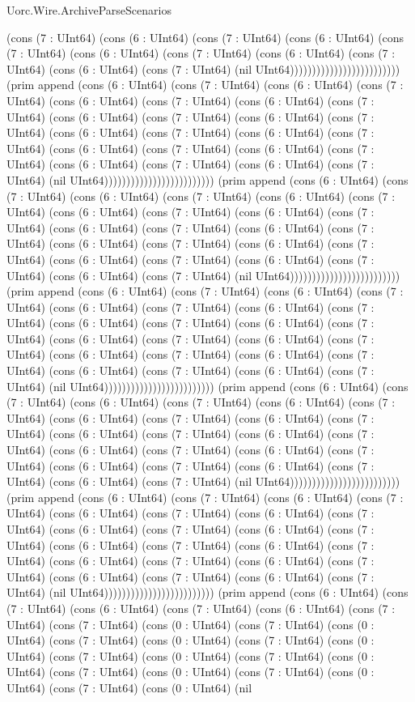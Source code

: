 \begin{lexlean}{Uorc.Wire.ArchiveParseScenarios}
\begin{semanticmodule}
{(cons (7 : UInt64) (cons (6 : UInt64) (cons (7 : UInt64) (cons (6 : UInt64) (cons (7 : UInt64) (cons (6 : UInt64) (cons (7 : UInt64) (cons (6 : UInt64) (cons (7 : UInt64) (cons (6 : UInt64) (cons (7 : UInt64) (nil UInt64))))))))))))))))))))))))) (prim append (cons (6 : UInt64) (cons (7 : UInt64) (cons (6 : UInt64) (cons (7 : UInt64) (cons (6 : UInt64) (cons (7 : UInt64) (cons (6 : UInt64) (cons (7 : UInt64) (cons (6 : UInt64) (cons (7 : UInt64) (cons (6 : UInt64) (cons (7 : UInt64) (cons (6 : UInt64) (cons (7 : UInt64) (cons (6 : UInt64) (cons (7 : UInt64) (cons (6 : UInt64) (cons (7 : UInt64) (cons (6 : UInt64) (cons (7 : UInt64) (cons (6 : UInt64) (cons (7 : UInt64) (cons (6 : UInt64) (cons (7 : UInt64) (nil UInt64))))))))))))))))))))))))) (prim append (cons (6 : UInt64) (cons (7 : UInt64) (cons (6 : UInt64) (cons (7 : UInt64) (cons (6 : UInt64) (cons (7 : UInt64) (cons (6 : UInt64) (cons (7 : UInt64) (cons (6 : UInt64) (cons (7 : UInt64) (cons (6 : UInt64) (cons (7 : UInt64) (cons (6 : UInt64) (cons (7 : UInt64) (cons (6 : UInt64) (cons (7 : UInt64) (cons (6 : UInt64) (cons (7 : UInt64) (cons (6 : UInt64) (cons (7 : UInt64) (cons (6 : UInt64) (cons (7 : UInt64) (cons (6 : UInt64) (cons (7 : UInt64) (nil UInt64))))))))))))))))))))))))) (prim append (cons (6 : UInt64) (cons (7 : UInt64) (cons (6 : UInt64) (cons (7 : UInt64) (cons (6 : UInt64) (cons (7 : UInt64) (cons (6 : UInt64) (cons (7 : UInt64) (cons (6 : UInt64) (cons (7 : UInt64) (cons (6 : UInt64) (cons (7 : UInt64) (cons (6 : UInt64) (cons (7 : UInt64) (cons (6 : UInt64) (cons (7 : UInt64) (cons (6 : UInt64) (cons (7 : UInt64) (cons (6 : UInt64) (cons (7 : UInt64) (cons (6 : UInt64) (cons (7 : UInt64) (cons (6 : UInt64) (cons (7 : UInt64) (nil UInt64))))))))))))))))))))))))) (prim append (cons (6 : UInt64) (cons (7 : UInt64) (cons (6 : UInt64) (cons (7 : UInt64) (cons (6 : UInt64) (cons (7 : UInt64) (cons (6 : UInt64) (cons (7 : UInt64) (cons (6 : UInt64) (cons (7 : UInt64) (cons (6 : UInt64) (cons (7 : UInt64) (cons (6 : UInt64) (cons (7 : UInt64) (cons (6 : UInt64) (cons (7 : UInt64) (cons (6 : UInt64) (cons (7 : UInt64) (cons (6 : UInt64) (cons (7 : UInt64) (cons (6 : UInt64) (cons (7 : UInt64) (cons (6 : UInt64) (cons (7 : UInt64) (nil UInt64))))))))))))))))))))))))) (prim append (cons (6 : UInt64) (cons (7 : UInt64) (cons (6 : UInt64) (cons (7 : UInt64) (cons (6 : UInt64) (cons (7 : UInt64) (cons (6 : UInt64) (cons (7 : UInt64) (cons (6 : UInt64) (cons (7 : UInt64) (cons (6 : UInt64) (cons (7 : UInt64) (cons (6 : UInt64) (cons (7 : UInt64) (cons (6 : UInt64) (cons (7 : UInt64) (cons (6 : UInt64) (cons (7 : UInt64) (cons (6 : UInt64) (cons (7 : UInt64) (cons (6 : UInt64) (cons (7 : UInt64) (cons (6 : UInt64) (cons (7 : UInt64) (nil UInt64))))))))))))))))))))))))) (prim append (cons (6 : UInt64) (cons (7 : UInt64) (cons (6 : UInt64) (cons (7 : UInt64) (cons (6 : UInt64) (cons (7 : UInt64) (cons (7 : UInt64) (cons (0 : UInt64) (cons (7 : UInt64) (cons (0 : UInt64) (cons (7 : UInt64) (cons (0 : UInt64) (cons (7 : UInt64) (cons (0 : UInt64) (cons (7 : UInt64) (cons (0 : UInt64) (cons (7 : UInt64) (cons (0 : UInt64) (cons (7 : UInt64) (cons (0 : UInt64) (cons (7 : UInt64) (cons (0 : UInt64) (cons (7 : UInt64) (cons (0 : UInt64) (nil }
\end{semanticmodule}
\end{lexlean}
